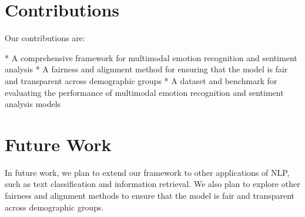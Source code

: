 \documentclass{article}
\begin{document}
\section{Contributions}

Our contributions are:

*   A comprehensive framework for multimodal emotion recognition and sentiment analysis
*   A fairness and alignment method for ensuring that the model is fair and transparent across demographic groups
*   A dataset and benchmark for evaluating the performance of multimodal emotion recognition and sentiment analysis models

\section{Future Work}

In future work, we plan to extend our framework to other applications of NLP, such as text classification and information retrieval. We also plan to explore other fairness and alignment methods to ensure that the model is fair and transparent across demographic groups.
\end{document}
